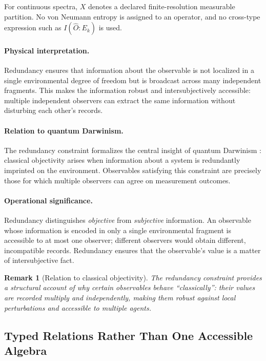 \documentclass[12pt,a4paper,openany]{book}
\newtheorem{remark}[theorem]{Remark}
\begin{document}
For continuous spectra, $X$ denotes a declared finite-resolution measurable partition.  No von Neumann entropy is assigned to an operator, and no cross-type expression such as $I(\hat O:E_k)$ is used.

\paragraph{Physical interpretation.}
Redundancy ensures that information about the observable is not localized in a single environmental degree of freedom but is broadcast across many independent fragments. This makes the information robust and intersubjectively accessible: multiple independent observers can extract the same information without disturbing each other's records.

\paragraph{Relation to quantum Darwinism.}
The redundancy constraint formalizes the central insight of quantum Darwinism \cite{Zurek2009}: classical objectivity arises when information about a system is redundantly imprinted on the environment. Observables satisfying this constraint are precisely those for which multiple observers can agree on measurement outcomes.

\paragraph{Operational significance.}
Redundancy distinguishes \emph{objective} from \emph{subjective} information. An observable whose information is encoded in only a single environmental fragment is accessible to at most one observer; different observers would obtain different, incompatible records. Redundancy ensures that the observable's value is a matter of intersubjective fact.

\begin{remark}[Relation to classical objectivity]
The redundancy constraint provides a structural account of why certain observables behave ``classically'': their values are recorded multiply and independently, making them robust against local perturbations and accessible to multiple agents.
\end{remark}

\subsection{Typed Relations Rather Than One Accessible Algebra}
\end{document}
